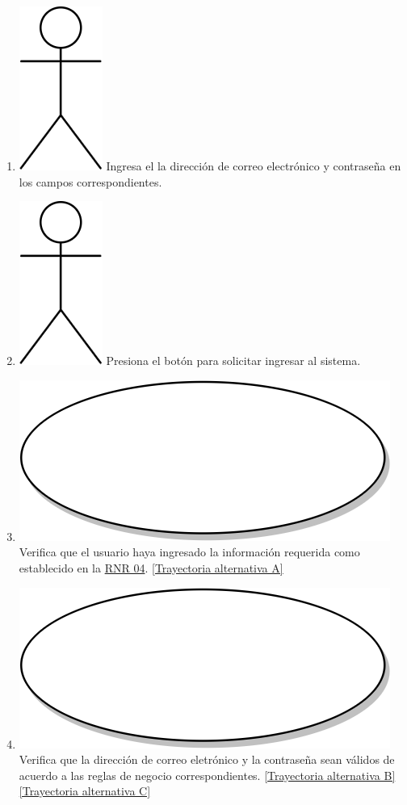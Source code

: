 \begin{enumerate}
  \item {\includegraphics[scale=.1]{Capitulo3/img/actor.png} Ingresa el la dirección de correo electrónico y contraseña en los campos correspondientes.}
  \item {\includegraphics[scale=.1]{Capitulo3/img/actor.png} Presiona el botón para solicitar ingresar al sistema.}
  \item {\includegraphics[scale=.05]{Capitulo3/img/proceso.png} Verifica que el usuario haya ingresado la información requerida como establecido en la \hyperref[rnl_04]{RNR 04}. \hyperref[cu1_ta_a]{[Trayectoria alternativa A]}}
  \item {\includegraphics[scale=.05]{Capitulo3/img/proceso.png} Verifica que la dirección de correo eletrónico y la contraseña sean válidos de acuerdo a las reglas de negocio correspondientes. \hyperref[cu1_ta_b]{[Trayectoria alternativa B]} \hyperref[cu1_ta_c]{[Trayectoria alternativa C]}}

\end{enumerate}
